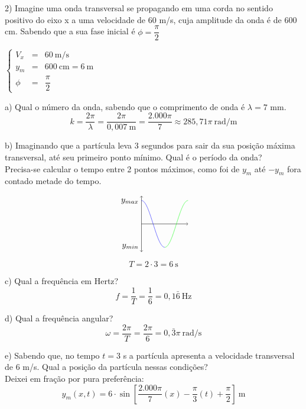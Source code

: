 \documentclass[12pt,a4paper]{article}
\begin{document}
  2) Imagine uma onda transversal se propagando em uma corda no sentido positivo
   do eixo x a uma velocidade de 60 m/s, cuja amplitude da onda é de 600 cm.
   Sabendo que a sua fase inicial é $\phi = \dfrac{\pi}{2}$
  \vspace*{.2cm}

  \(
    \left\{
      \begin{array}{ccl}
        V_x & = & 60\ \text{m/s} \\
        y_m & = & 600\ \text{cm} = 6\ \text{m}\\
        \phi & = & \dfrac{\pi}{2}
      \end{array}
    \right.
  \)
  \vspace*{.5cm}

  a) Qual o número da onda, sabendo que o comprimento de onda é $\lambda = 7$ mm.
  \[
      k = \frac{2\pi}{\lambda} = \frac{2\pi}{0,007\ \text{m}} = \frac{2.000\pi}{7} \approx 285,71\pi\ \text{rad/m}
  \]

  b) Imaginando que a partícula leva 3 segundos para sair da sua posição máxima transversal, até seu primeiro ponto mínimo.
  Qual é o período da onda? \\
  Precisa-se calcular o tempo entre 2 pontos máximos, como foi de $y_m$ até $-y_m$ fora contado metade do tempo.

  \[
    \begin{tikzpicture}[samples=100,smooth]
      \draw[<->] (0,-1.2) node[anchor=south east]{$y_{min}$} -- (0,1.2) node[anchor=north east]{$y_{max}$};
      \draw[->] (0,0) -- (2,0);

      \draw[blue] plot[domain=0:1](\x,{cos(pi * \x r)});
      
      \draw[green] plot[domain=1:2](\x,{cos(pi * \x r)});
    \end{tikzpicture}
  \]

  \[
    T = 2\cdot3 = 6\ \text{s}
  \]

  c) Qual a frequência em Hertz?
  \[
    f = \frac{1}{T} = \frac{1}{6} = 0,1\bar{6}\ \text{Hz}
  \]

  d) Qual a frequência angular?
  \[
    \omega = \frac{2\pi}{T} = \frac{2\pi}{6} = 0,\bar{3}\pi\ \text{rad/s}
  \]

  e) Sabendo que, no tempo $t = 3$ s a partícula apresenta a velocidade transversal
  de $6$ m/s. Qual a posição da partícula nessas condições? \\
  Deixei em fração por pura preferência:
  \[
    y_m(x,t) = 6\cdot\sin\left[\frac{2.000\pi}{7}(x) - \frac{\pi}{3}(t) + \frac{\pi}{2}\right]\ \text{m}
  \]
\end{document}
